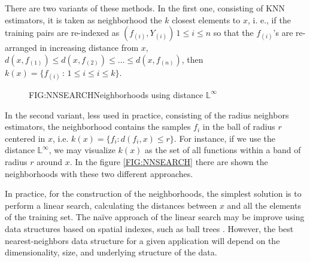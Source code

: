 
There are two variants of these methods. In the first one, consisting of
\ac{KNN} estimators, it is taken as neighborhood the $k$ closest
elements to $x$, i. e., if the training pairs are re-indexed as
$(f_{(i)}, Y_{(i)}) \, 1\le i\le n$ so that the
$f_{(i)}$'s are re-arranged in increasing distance from $x$,
$d(x, f_{(1)}) \le d(x, f_{(2)}) \le \dots \le d(x, f_{(n)})$,
 then $k(x) = \{f_{(i)} \, : \, 1 \le i \le i\le k\}$.

\begin{figure}[Neighborhoods using distance $\mathbb{L}^\infty$]{FIG:NNSEARCH}{Neighborhoods using distance $\mathbb{L}^\infty$}
	 \quad
\end{figure}

In the second variant, less used in practice, consisting of the radius neighbors
estimators, the neighborhood contains the samples $f_i$ in the ball of
radius $r$ centered in $x$, i.e.
$k(x) = \{ f_i : d(f_i , x) \le r\}$. For instance, if we
use the distance $\mathbb{L}^\infty$, we may visualize $k(x)$ as the set of all
functions within a band  of radius $r$ around $x$.
In the figure \ref{FIG:NNSEARCH} there are shown the neighborhoods with these two different
approaches.

In practice, for the construction of the neighborhoods, the simplest solution is
 to perform a linear search, calculating the distances between $x$ and all the
 elements of the training set.
The naïve approach of the linear search may be improve using data structures
based on spatial indexes, such as ball trees \cite{Kumar2008}. However, the best
nearest-neighbors data structure for a given application will depend on the
dimensionality, size, and underlying structure of the data.
